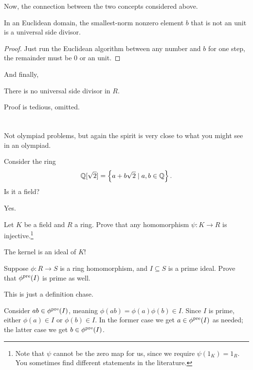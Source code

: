 Now, the connection between the two concepts considered above.
\begin{lemma}
	In an Euclidean domain,
	the smallest-norm nonzero element $b$ that is not an unit is a universal side divisor.
\end{lemma}
\begin{proof}
	Just run the Euclidean algorithm between any number and $b$ for one step, the remainder must be
	$0$ or an unit.
\end{proof}

And finally,
\begin{proposition}
	There is no universal side divisor in $R$.
\end{proposition}
Proof is tedious, omitted.  %

\section{\problemhead}
Not olympiad problems, but again the spirit is very close
to what you might see in an olympiad.

\begin{problem}
	Consider the ring
	\[ \mathbb Q[\sqrt2] = \left\{ a + b\sqrt2 \mid a,b \in \mathbb Q \right\}. \]
	Is it a field?
	\begin{hint}
		Yes.
	\end{hint}
\end{problem}

\begin{problem}
	\label{prob:field_hom}
	Let $K$ be a field and $R$ a ring.
	Prove that any homomorphism $\psi \colon K \to R$
	is injective.\footnote{Note that $\psi$
		cannot be the zero map for us,
		since we require $\psi(1_K) = 1_R$.
		You sometimes find different statements in the literature.}
	\begin{hint}
		The kernel is an ideal of $K$!
	\end{hint}
\end{problem}

\begin{sproblem}
	\label{prob:prime_preimage}
	Suppose $\phi \colon R \to S$ is a ring homomorphism,
	and $I \subseteq S$ is a prime ideal.
	Prove that $\phi^{\text{pre}}(I)$ is prime as well.
	\begin{hint}
		This is just a definition chase.
	\end{hint}
	\begin{sol}
		Consider $ab \in \phi^{\text{pre}}(I)$,
		meaning $\phi(ab) = \phi(a) \phi(b) \in I$.
		Since $I$ is prime, either $\phi(a) \in I$ or $\phi(b) \in I$.
		In the former case we get $a \in \phi^{\text{pre}}(I)$ as needed;
		the latter case we get $b \in \phi^{\text{pre}}(I)$.
	\end{sol}
\end{sproblem}

